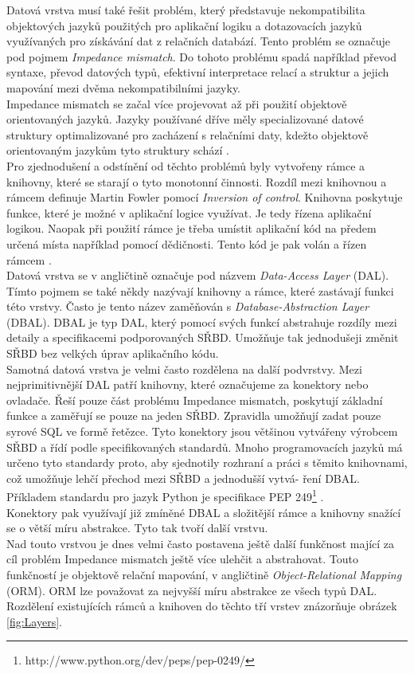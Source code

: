 \documentclass[ing,male,java,dept456]{diploma}						%
\begin{document}
Datová vrstva musí také řešit problém, který představuje nekompatibilita objektových jazyků použitých pro aplikační logiku a dotazovacích jazyků využívaných pro získávání dat z relačních databází. Tento problém se označuje pod pojmem \textit{Impedance mismatch}. Do tohoto problému spadá například převod syntaxe, převod datových typů, efektivní interpretace relací a struktur a jejich mapování mezi dvěma nekompatibilními jazyky. \\
Impedance mismatch se začal více projevovat až při použití objektově orientovaných jazyků. Jazyky používané dříve měly specializované datové struktury optimalizované pro zacházení s relačními daty, kdežto objektově orientovaným jazykům tyto struktury schází \cite{dbprogrammer}. \\

Pro zjednodušení a odstínění od těchto problémů byly vytvořeny rámce a knihovny, které se starají o tyto monotonní činnosti. Rozdíl mezi knihovnou a rámcem definuje Martin Fowler pomocí \textit{Inversion of control}. Knihovna poskytuje funkce, které je možné v aplikační logice využívat. Je tedy řízena aplikační logikou. Naopak při použití rámce je třeba umístit aplikační kód na předem určená místa například pomocí dědičnosti. Tento kód je pak volán a řízen rámcem \cite{fowler-ioc}.  \\

Datová vrstva se v angličtině označuje pod názvem \textit{Data-Access Layer} (DAL). Tímto pojmem se také někdy nazývají knihovny a rámce, které zastávají funkci této vrstvy. Často je tento název zaměňován s \textit{Database-Abstraction Layer} (DBAL). DBAL je typ DAL, který pomocí svých funkcí abstrahuje rozdíly mezi detaily a specifikacemi podporovaných SŘBD. Umožňuje tak jednodušeji změnit SŘBD bez velkých úprav aplikačního kódu. \\

Samotná datová vrstva je velmi často rozdělena na další podvrstvy. Mezi nejprimitivnější DAL patří knihovny, které označujeme za konektory nebo ovladače. Řeší pouze část problému Impedance mismatch, poskytují základní funkce a zaměřují se pouze na jeden SŘBD. Zpravidla umožňují zadat pouze syrové SQL ve formě řetězce. Tyto konektory jsou většinou vytvářeny výrobcem SŘBD a řídí podle specifikovaných standardů. Mnoho programovacích jazyků má určeno tyto standardy proto, aby sjednotily rozhraní a práci s těmito knihovnami, což umožňuje lehčí přechod mezi SŘBD a jednodušší vytvá- ření DBAL. Příkladem standardu pro jazyk Python je specifikace PEP 249\footnote{http://www.python.org/dev/peps/pep-0249/} .\\
Konektory pak využívají již zmíněné DBAL a složitější rámce a knihovny snažící se o větší míru abstrakce. Tyto tak tvoří další vrstvu. \\
Nad touto vrstvou je dnes velmi často postavena ještě další funkčnost mající za cíl problém Impedance mismatch ještě více ulehčit a abstrahovat. Touto funkčností je objektově relační mapování, v angličtině \textit{Object-Relational Mapping} (ORM). ORM lze považovat za nejvyšší míru abstrakce ze všech typů DAL.  \\
Rozdělení existujících rámců a knihoven do těchto tří vrstev znázorňuje obrázek \ref{fig:Layers}.
\end{document}
